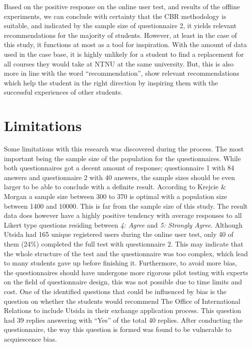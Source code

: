 Based on the positive response on the online user test, and results of the offline experiments, we can conclude with certainty that the CBR methodology is suitable, and indicated by the sample size of questionnaire 2, it yields relevant recommendations for the majority of students. However, at least in the case of this study, it functions at most as a tool for inspiration. With the amount of data used in the case base, it is highly unlikely for a student to find a replacement for all courses they would take at NTNU at the same university. But, this is also more in line with the word \enquote{recommendation}, show relevant recommendations which help the student in the right direction by inspiring them with the successful experiences of other students. 

\section{Limitations}

Some limitations with this research was discovered during the process. The most important being the sample size of the population for the questionnaires. While both questionnaires got a decent amount of response; questionnaire 1 with 84 answers and questionnaire 2 with 40 answers, the sample sizes should be even larger to be able to conclude with a definite result. According to Krejcie \& Morgan \cite{krejcie1970determining} a sample size between 300 to 370 is optimal with a population size between 1400 and 10000. This is far from the sample size of this study. The result data does however have a highly positive tendency with average responses to all Likert type questions residing between \textit{4: Agree} and \textit{5: Strongly Agree}. Although Utsida had 165 unique registered users during the online user test, only 40 of them (24\%) completed the full test with questionnaire 2. This may indicate that the whole structure of the test and the questionnaire was too complex, which lead to many students gave up before finishing it.  Furthermore, to avoid more bias, the questionnaires should have undergone more rigorous pilot testing with experts on the field of questionnaire design, this was not possible due to time limits and cost. One of the identified questions that could be influenced by bias is the question on whether the students would recommend The Office of International Relations to include Utsida in their exchange application process. This question had 39 replies answering with \enquote{Yes} of the total 40 replies. After conducting the questionnaire, the way this question is formed was found to be vulnerable to acquiescence bias.

